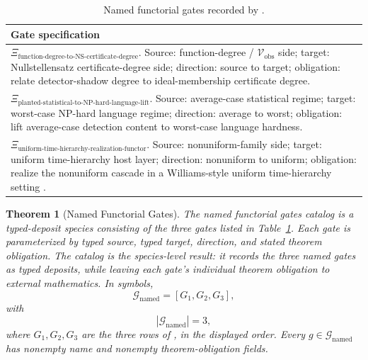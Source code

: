\documentclass[11pt]{article}
\newcommand{\Cvobs}{\mathcal{V}_{\text{obs}}}
\newcommand{\TDS}{typed-deposit species}
\newcommand{\GateFunctionDegree}{\Xi_{\text{function-degree-to-NS-certificate-degree}}}
\newcommand{\GatePlantedStatistical}{\Xi_{\text{planted-statistical-to-NP-hard-language-lift}}}
\newcommand{\GateUniformTime}{\Xi_{\text{uniform-time-hierarchy-realization-functor}}}
\newtheorem{theorem}{Theorem}[section]
\theoremstyle{definition}
\begin{document}
\begin{table}[H]
  \centering
  \caption{Named functorial gates recorded by .}
  \label{tab:functorial-gates}
  \scriptsize
  \renewcommand{\arraystretch}{1.08}
  \begin{tabularx}{\textwidth}{@{}>{\raggedright\arraybackslash}X@{}}
    \toprule
    Gate specification \\
    \midrule
    \(\GateFunctionDegree\). Source: function-degree / \(\Cvobs\) side; target: Nullstellensatz certificate-degree side; direction: source to target; obligation: relate detector-shadow degree to ideal-membership certificate degree. \\
    \addlinespace
    \(\GatePlantedStatistical\). Source: average-case statistical regime; target: worst-case NP-hard language regime; direction: average to worst; obligation: lift average-case detection content to worst-case language hardness. \\
    \addlinespace
    \(\GateUniformTime\). Source: nonuniform-family side; target: uniform time-hierarchy host layer; direction: nonuniform to uniform; obligation: realize the nonuniform cascade in a Williams-style uniform time-hierarchy setting \cite{Williams2014NonUniformACC}. \\
    \bottomrule
  \end{tabularx}
\end{table}
 
\begin{theorem}[Named Functorial Gates]\label{cat:named-functorial-gates}
The named functorial gates catalog is a \TDS{} consisting of the three
gates listed in Table~\ref{tab:functorial-gates}.  Each gate is
parameterized by typed source, typed target, direction, and stated theorem
obligation.  The catalog is the
species-level result: it records the three named gates as typed deposits,
while leaving each gate's individual theorem obligation to external
mathematics.
In symbols,
\[
  \mathcal G_{\mathrm{named}}
  =
  [G_1,G_2,G_3],
\]
with
\[
  |\mathcal G_{\mathrm{named}}|=3,
\]
where \(G_1,G_2,G_3\) are the three rows of
, in the displayed order.  Every
\(g\in\mathcal G_{\mathrm{named}}\) has nonempty name and nonempty
theorem-obligation fields.
\end{theorem}
\end{document}
